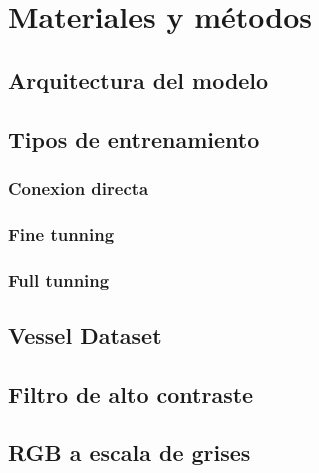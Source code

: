 \section{Materiales y métodos}





\subsection{Arquitectura del modelo}







\subsection{Tipos de entrenamiento}

\subsubsection{Conexion directa}

\subsubsection{Fine tunning}

\subsubsection{Full tunning}

\subsection{Vessel Dataset}

\subsection{Filtro de alto contraste}

\subsection{RGB a escala de grises}